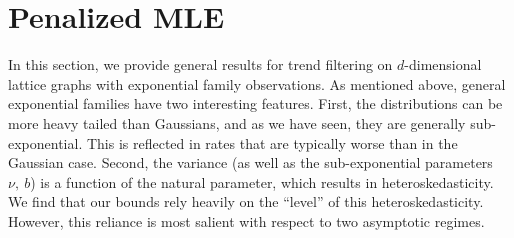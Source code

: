 \documentclass[ejs,noshowframe]{imsart}
\theoremstyle{plain}
\theoremstyle{definition}
\begin{document}




\section{Penalized MLE}
\label{sec:theory_mle}


In this section, we provide general results for trend filtering on $d$-dimensional
lattice graphs with exponential family observations. As mentioned above, general
exponential families have two interesting features. First, the distributions can
be more heavy tailed than Gaussians, and as we have seen, they are generally
sub-exponential. This is reflected in rates that are typically worse than in the
Gaussian case. Second, the variance (as well as the sub-exponential parameters
$\nu,\ b$) is a function of the natural parameter, which results in
heteroskedasticity. We find that our bounds rely heavily on the ``level'' of
this heteroskedasticity. However, this reliance is most salient with respect to
two asymptotic regimes.
\end{document}

